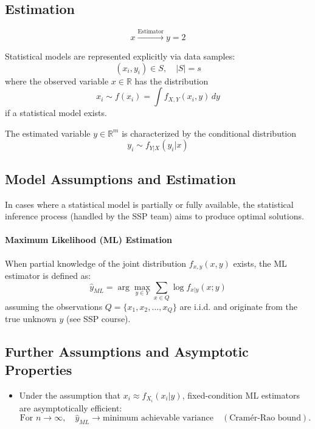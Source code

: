 \documentclass[a4paper, 11pt]{article}
\begin{document}
\subsection{Estimation}
\begin{equation}
x \xrightarrow{\text{Estimator}} y = 2
\end{equation}

Statistical models are represented explicitly via data samples:
\begin{equation}
\left( x_i, y_i \right) \in S, \quad |S|=s
\end{equation}
where the observed variable $x \in \mathbb{R}$ has the distribution
\begin{equation}
x_i \sim f(x_i) = \int f_{X,Y}(x_i, y) \, dy
\end{equation}
if a statistical model exists.

The estimated variable $y \in \mathbb{R}^m$ is characterized by the conditional distribution
\begin{equation}
y_i \sim f_{Y|X}(y_i|x)
\end{equation}

\subsection{Model Assumptions and Estimation}
In cases where a statistical model is partially or fully available, the statistical inference process (handled by the SSP team) aims to produce optimal solutions.  
\paragraph{Maximum Likelihood (ML) Estimation}  
When partial knowledge of the joint distribution $f_{x,y}(x, y)$ exists, the ML estimator is defined as:
\begin{equation}
\hat{y}_{ML} = \arg \max_{y \in Y} \sum_{x \in Q} \log f_{x|y}(x; y)
\end{equation}
assuming the observations $Q = \{x_1, x_2, \ldots, x_Q\}$ are i.i.d. and originate from the true unknown $y$ (see SSP course).

\subsection{Further Assumptions and Asymptotic Properties}
\begin{itemize}
    \item Under the assumption that $x_i \approx f_{X_i}(x_i| y)$, fixed-condition ML estimators are asymptotically efficient:
    \begin{equation}
    \text{For } n \to \infty, \quad \hat{y}_{ML} \to \text{minimum achievable variance} \quad (\text{Cramér-Rao bound}).
    \end{equation}
\end{itemize}
\end{document}
